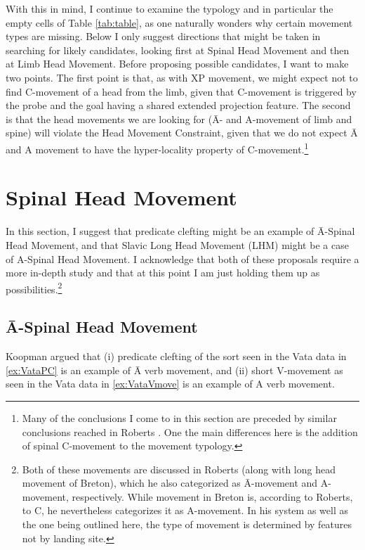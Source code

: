 \documentclass[output=paper,colorlinks,citecolor=brown,
]{langscibook}
\begin{document}
With this in mind, I continue to examine the typology and in particular the empty cells of Table \ref{tab:table}, as one naturally wonders why certain movement types are missing.  Below I only suggest directions that might be taken in searching for likely candidates, looking first at Spinal Head Movement and then at Limb Head Movement.  Before proposing possible candidates, I want to make two points.  The first point is that, as with XP movement, we might  expect not to find C-movement of a head from the limb, given that C-movement is triggered by the probe and the goal having a shared extended projection feature. The second is that the head movements we are looking for (\=A- and A-movement of limb and spine) will violate the Head Movement Constraint, given that we do not expect  \=A and A movement to have the hyper-locality property of C-movement.\footnote{Many of the conclusions I come to in this section are preceded by similar conclusions reached in Roberts \citeyearpar{Roberts:2010}.  One the main differences here is the  addition of spinal C-movement to the movement typology.}
 
\section{Spinal Head Movement}

In this section, I suggest that predicate clefting might be an example of \=A-Spinal Head Movement, and that Slavic Long Head Movement (LHM) might be a case of A-Spinal Head Movement.  I acknowledge that both of these proposals require a more in-depth study and that at this point I am just holding them up as possibilities.\footnote{Both of these movements are discussed in Roberts \citeyearpar{Roberts:2010} (along with long head movement of Breton), which he also categorized as \=A-movement and A-movement, respectively.  While movement in Breton is, according to Roberts, to C, he nevertheless categorizes it as A-movement.  In his system as well as the one being outlined here, the type of movement is determined by features not by landing site.}


\subsection{\=A-Spinal Head Movement}

Koopman \citeyearpar{Koopman:1984} argued that (i) predicate clefting of the sort seen in the Vata data in \ref{ex:VataPC}   is an example of \=A verb movement, and (ii) short V-movement as seen in the Vata data in   \ref{ex:VataVmove} is an example of A verb movement.  
\end{document}
